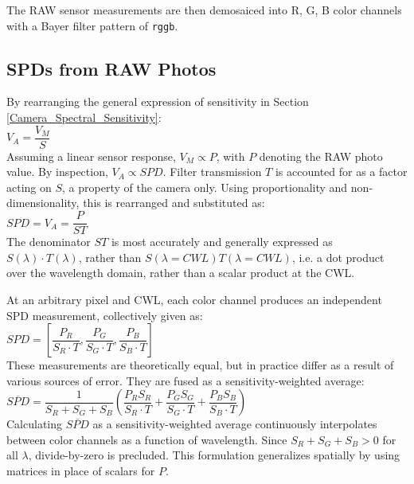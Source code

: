 \documentclass[twocolumn,10pt]{asme2ej}
\newcommand{\id}{\hspace{6 mm}}
\begin{document}
The RAW sensor measurements are then demosaiced into R, G, B color channels with a Bayer filter pattern of \texttt{rggb}.

\subsection{SPDs from RAW Photos}

 By rearranging the general expression of sensitivity in Section \ref{Camera_Spectral_Sensitivity}: \\

 $V_A = \dfrac{V_M}{S}$ \\

Assuming a linear sensor response, $V_M \propto P$, with $P$ denoting the RAW photo value. By inspection, $V_A \propto SPD$. Filter transmission $T$ is accounted for as a factor acting on $S$, a property of the camera only. Using proportionality and non-dimensionality, this is rearranged and substituted as: \\

 $SPD = V_A = \dfrac{P}{ST}$ \\

The denominator $ST$ is most accurately and generally expressed as $S(\lambda) \cdot T(\lambda)$, rather than $S(\lambda=CWL) T(\lambda=CWL)$, i.e. a dot product over the wavelength domain, rather than a scalar product at the CWL.

\id At an arbitrary pixel and CWL, each color channel produces an independent SPD measurement, collectively given as: \\

 $SPD = \left[ \dfrac{P_R}{S_R \cdot T},\dfrac{P_G}{S_G \cdot T},\dfrac{P_B}{S_B \cdot T} \right] $ \\

These measurements are theoretically equal, but in practice differ as a result of various sources of error. They are fused as a sensitivity-weighted average: \\

$\overline{SPD} = \dfrac{1}{S_R+S_G+S_B} \left( \dfrac{P_R S_R}{S_R \cdot T} + \dfrac{P_G S_G}{S_G \cdot T} + \dfrac{P_B S_B}{S_B \cdot T} \right)$\\

Calculating $\overline{SPD}$ as a sensitivity-weighted average continuously interpolates between color channels as a function of wavelength. Since $S_R+S_G+S_B > 0$ for all $\lambda$, divide-by-zero is precluded. This formulation generalizes spatially by using matrices in place of scalars for $P$.
\end{document}
